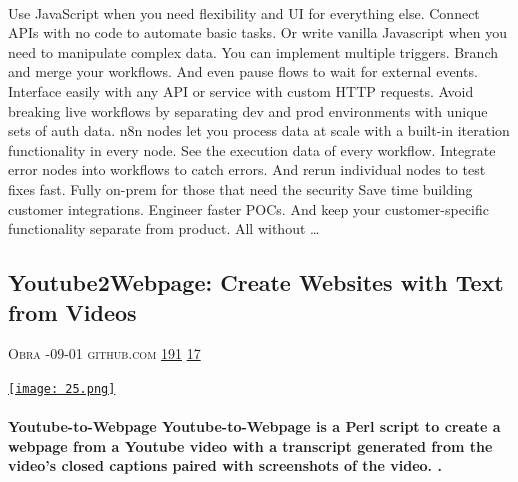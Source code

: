 \documentclass[10pt,a4paper]{article}
\begin{document}
\begin{multicols}{2}
\paragraph{}

Use JavaScript when you need flexibility and UI for everything else.
Connect APIs with no code to automate basic tasks. Or write vanilla Javascript when you need to manipulate complex data.
You can implement multiple triggers. Branch and merge your workflows. And even pause flows to wait for external events.
Interface easily with any API or service with custom HTTP requests.
Avoid breaking live workflows by separating dev and prod environments with unique sets of auth data.
n8n nodes let you process data at scale with a built-in iteration functionality in every node.
See the execution data of every workflow. Integrate error nodes into workflows to catch errors. And rerun individual nodes to test fixes fast.
Fully on-prem for those that need the security
Save time building customer integrations. Engineer faster POCs. And keep your customer-specific functionality separate from product. All without 
\dots\par
\noindent\begin{minipage}{\linewidth}
\medskip
\subsection{Youtube2Webpage: Create Websites with Text from Videos}
\textsc{\footnotesize
{\scriptsize\faUser}\space 
Obra 
{\scriptsize\faCalendar}-09-01 
{\scriptsize\faGithub}\space 
github.com 
{\scriptsize\faThumbsOUp}\space 
\href{http://news.ycombinator.com/item?id=37333195\&utm\_term=comment}{191} 
{\scriptsize\faComments}\space 
\href{http://news.ycombinator.com/item?id=37333195\&utm\_term=comment}{17} 
}
\par\medskip\noindent
\href{https://github.com/obra/Youtube2Webpage?utm\_source=hackernewsletter\&utm\_medium=email\&utm\_term=show\_hn}{
    \texttt{[image: 25.png]}
}
\end{minipage}
\paragraph{}
\textbf{Youtube-to-Webpage
Youtube-to-Webpage is a Perl script to create a webpage from a Youtube video with a transcript generated from the video's closed captions paired with screenshots of the video.
.}

\end{multicols}
\end{document}
